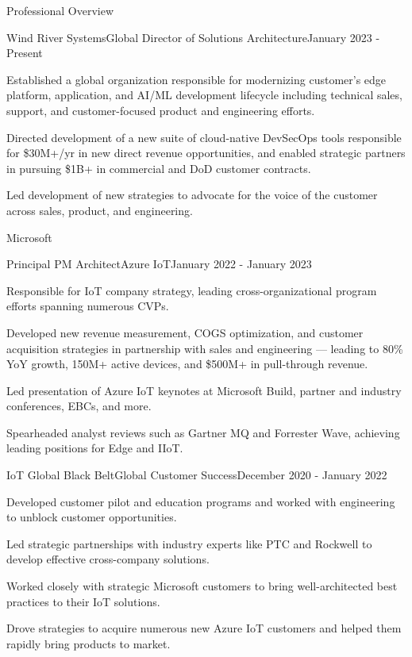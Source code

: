 \documentclass{resume} %
\begin{document}
\begin{rSection}{Professional Overview}
  
  \begin{rNewRole}{Wind River Systems}{Global Director of Solutions Architecture}{January 2023 - Present}
    \item Established a global organization responsible for modernizing customer's edge platform, application, and AI/ML development lifecycle including technical sales, support, and customer-focused product and engineering efforts.
    \item Directed development of a new suite of cloud-native DevSecOps tools responsible for \$30M+/yr in new direct revenue opportunities, and enabled strategic partners in pursuing \$1B+ in commercial and DoD customer contracts.
    \item Led development of new strategies to advocate for the voice of the customer across sales, product, and engineering.
  \end{rNewRole}

  \begin{rCompany}{Microsoft}{}{}

    \begin{rSubSubsection}{Principal PM Architect}{Azure IoT}{January 2022 - January 2023}
        
      \item Responsible for IoT company strategy, leading cross-organizational program efforts spanning numerous CVPs.
      \item Developed new revenue measurement, COGS optimization, and customer acquisition strategies in partnership with sales and engineering --- leading to 80\% YoY growth, 150M+ active devices, and \$500M+ in pull-through revenue.
      \item Led presentation of Azure IoT keynotes at Microsoft Build, partner and industry conferences, EBCs, and more.
      \item Spearheaded analyst reviews such as Gartner MQ and Forrester Wave, achieving leading positions for Edge and IIoT.
      
    \end{rSubSubsection}

    \begin{rSubSubsection}{IoT Global Black Belt}{Global Customer Success}{December 2020 - January 2022}
        
      \item Developed customer pilot and education programs and worked with engineering to unblock customer opportunities.
      \item Led strategic partnerships with industry experts like PTC and Rockwell to develop effective cross-company solutions.
      \item Worked closely with strategic Microsoft customers to bring well-architected best practices to their IoT solutions.
      \item Drove strategies to acquire numerous new Azure IoT customers and helped them rapidly bring products to market.
      

\end{rSubSubsection}
\end{rCompany}
\end{rSection}
\end{document}
